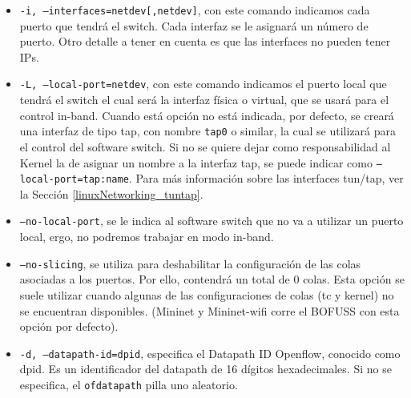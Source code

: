 \begin{itemize}
    \item \texttt{-i, --interfaces=netdev[,netdev]}, con este comando indicamos cada puerto que tendrá el switch. Cada interfaz se le asignará un número de puerto. Otro detalle a tener en cuenta es que las interfaces no pueden tener IPs.

    \item \texttt{-L, --local-port=netdev}, con este comando indicamos el puerto local que tendrá el switch el cual será la interfaz física o virtual, que se usará para el control in-band. Cuando está opción no está indicada, por defecto, se creará una interfaz de tipo tap, con nombre \texttt{tap0} o similar, la cual se utilizará para el control del software switch. Si no se quiere dejar como responsabilidad al Kernel la de asignar un nombre a la interfaz tap, se puede indicar como \texttt{--local-port=tap:name}. Para más información sobre las interfaces tun/tap, ver la Sección \ref{linuxNetworking_tuntap}.

    \item \texttt{--no-local-port}, se le indica al software switch que no va a utilizar un puerto local, ergo, no podremos trabajar en modo in-band.

    \item \texttt{--no-slicing}, se utiliza para deshabilitar la configuración de las colas asociadas a los puertos. Por ello, contendrá un total de 0 colas. Esta opción se suele utilizar cuando algunas de las configuraciones de colas (tc y kernel) no se encuentran disponibles. (Mininet y Mininet-wifi corre el BOFUSS con esta opción por defecto).

    \item \texttt{-d, --datapath-id=dpid}, especifica el Datapath ID Openflow, conocido como dpid. Es un identificador del datapath de 16 dígitos hexadecimales. Si no se especifica, el \texttt{ofdatapath} pilla uno aleatorio.
\end{itemize}
\newpage
